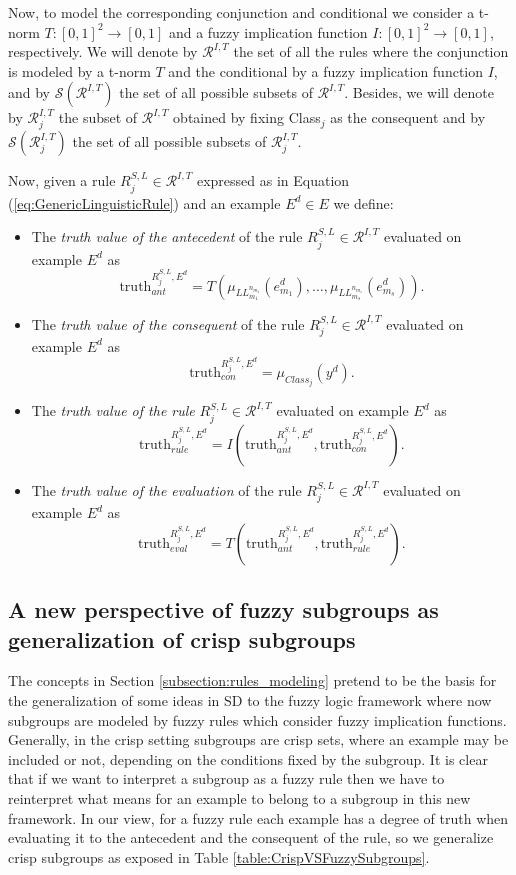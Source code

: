 Now, to model the corresponding conjunction and conditional we consider a t-norm $T:[0,1]^2 \to [0,1]$ and a fuzzy implication function $I:[0,1]^2 \to [0,1]$, respectively. We will denote by $\mathcal{R}^{I,T}$ the set of all the rules where the conjunction is modeled by a t-norm $T$ and the conditional by a fuzzy implication function $I$, and by $\mathcal{S}(\mathcal{R}^{I,T})$ the set of all possible subsets of $\mathcal{R}^{I,T}$. Besides, we will denote by $\mathcal{R}^{I,T}_j$ the subset of $\mathcal{R}^{I,T}$ obtained by fixing Class$_{j}$ as the consequent and by $\mathcal{S}(\mathcal{R}_j^{I,T})$ the set of all possible subsets of $\mathcal{R}^{I,T}_j$.

Now, given a rule $R^{S,L}_j \in \mathcal{R}^{I,T}$ expressed as in Equation (\ref{eq:GenericLinguisticRule}) and an example $E^d \in E$ we define:
\begin{itemize}
	\item The \emph{truth value of the antecedent} of the rule $R^{S,L}_j \in \mathcal{R}^{I,T}$ evaluated on example $E^d$ as
	$$\text{truth}_{ant}^{R^{S,L}_j,E^d}=T\left(\mu_{LL_{m_1}^{n_{m_1}}}(e_{m_1}^d), \dots, \mu_{LL_{m_s}^{n_{m_s}}}(e_{m_s}^d) \right).$$
	\item The \emph{truth value of the consequent} of the rule $R^{S,L}_j \in \mathcal{R}^{I,T}$ evaluated on example $E^d$ as
	$$\text{truth}_{con}^{R^{S,L}_j,E^d}=\mu_{Class_j}(y^d).$$
	\item The \emph{truth value of the rule} $R^{S,L}_j \in \mathcal{R}^{I,T}$ evaluated on example $E^d$ as
	$$\text{truth}_{rule}^{R^{S,L}_j,E^d}=I(\text{truth}_{ant}^{R^{S,L}_j,E^d},\text{truth}_{con}^{R^{S,L}_j,E^d}).$$
	\item The \emph{truth value of the evaluation} of the rule $R^{S,L}_j \in \mathcal{R}^{I,T}$ evaluated on example $E^d$ as
	$$\text{truth}_{eval}^{R^{S,L}_j,E^d}=T(\text{truth}_{ant}^{R^{S,L}_j,E^d},\text{truth}_{rule}^{R^{S,L}_j,E^d}).$$
\end{itemize}

\subsection{A new perspective of fuzzy subgroups as generalization of crisp subgroups}\label{subsection:fuzzy_subgroups}

The concepts in Section \ref{subsection:rules_modeling} pretend to be the basis for the generalization of some ideas in SD to the fuzzy logic framework where now subgroups are modeled by fuzzy rules which consider fuzzy implication functions. Generally, in the crisp setting subgroups are crisp sets, where an example may be included or not, depending on the conditions fixed by the subgroup. It is clear that if we want to interpret a subgroup as a fuzzy rule then we have to reinterpret what means for an example to belong to a subgroup in this new framework. In our view, for a fuzzy rule each example has a degree of truth when evaluating it to the antecedent and the consequent of the rule, so we generalize crisp subgroups as exposed in Table \ref{table:CrispVSFuzzySubgroups}.

